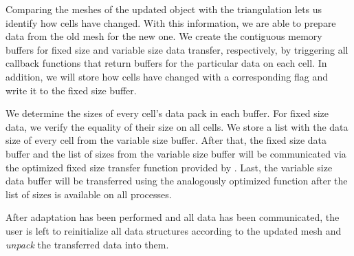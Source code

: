 Comparing the meshes of the updated \pforest{} object with the \dealii{} triangulation lets us identify how cells have changed.
With this information, we are able to prepare data from the old mesh for the new one. We create the contiguous memory buffers for fixed size and variable size data transfer, respectively, by triggering all callback functions that return buffers for the particular data on each cell. In addition, we will store how cells have changed with a corresponding flag and write it to the fixed size buffer.

We determine the sizes of every cell's data pack in each buffer. For fixed size data, we verify the equality of their size on all cells. We store a list with the data size of every cell from the variable size buffer. After that, the fixed size data buffer and the list of sizes from the variable size buffer will be communicated via the optimized fixed size transfer function provided by \pforest{} \parencite{burstedde2018}. Last, the variable size data buffer will be transferred using the analogously optimized function after the list of sizes is available on all processes.



After adaptation has been performed and all data has been communicated, the user is left to reinitialize all data structures according to the updated mesh and \textit{unpack} the transferred data into them.

%

